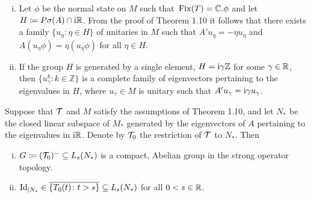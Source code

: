 \begin{remark}\label{rem:d3-1.12}

\begin{enumerate}[(i), wide]

\item 
Let $\phi$ be the normal state on $M$ such that $\mathop{}\mathrm{Fix}(T) = \mathbb{C} . \phi$ and let $H \coloneqq P\sigma(A) \cap \mathrm{i}\mathbb{R}$.
From the proof of Theorem 1.10 it follows that there exists a family $\{u_{\eta} \colon \eta \in H\}$ of unitaries in $M$ such that $A'u_{\eta} = -\eta u_{\eta}$ and $A(u_{\eta}\phi) = \eta(u_{\eta}\phi)$ for all $\eta \in H$.

\item 
If the group $H$ is generated by a single element, \ie $H = \mathrm{i}\gamma\mathbb{Z}$ for some $\gamma \in \mathbb{R}$, then 
$\{u_{\gamma}^{k} \colon k \in \mathbb{Z}\}$ 
is a complete family of eigenvectors pertaining to the eigenvalues in $H$, where $u_{\gamma} \in M$ is unitary such that $A'u_{\gamma} = \mathrm{i}\gamma u_{\gamma}$.

\end{enumerate}
\end{remark}
\begin{proposition}\label{prop:d3-1.13}
Suppose that $\mathcal{T}$ and $M$ satisfy the assumptions of Theorem 1.10, and let $N_{*}$ be the closed linear subspace of $M_{*}$ generated by the eigenvectors of $A$ pertaining to the eigenvalues in $\mathrm{i}\mathbb{R}$.
Denote by $\mathcal{T}_{0}$ the restriction of $\mathcal{T}$ to $N_{*}$.
Then
\begin{enumerate}[(i)]

\item 
$G \coloneqq (\mathcal{T}_{0})^{-} \subseteq L_{s}(N_{*})$ is a compact, Abelian group in the strong operator topology.

\item 
$\operatorname{Id}_{| N_{{*}}} \in \overline{\{T_{0}(t) \colon t>s\}} \subseteq L_{s}(N_{*})$ for all $0<s \in \mathbb{R}$.
\end{enumerate}
\end{proposition}
